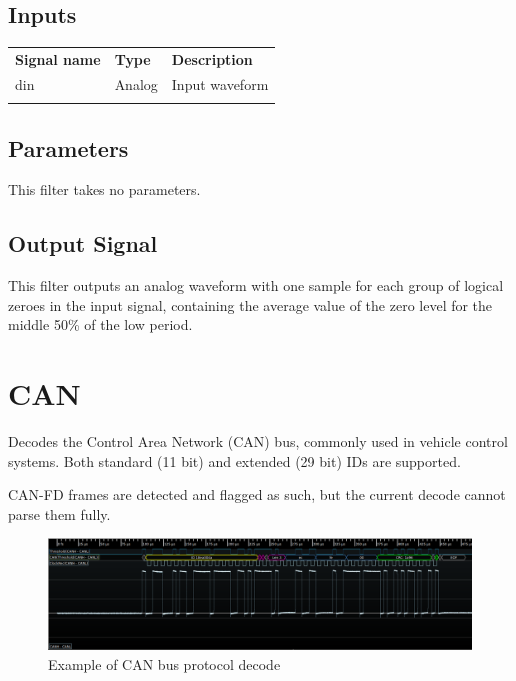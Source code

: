 \subsection{Inputs}

\begin{tabularx}{16cm}{llX}
\thickhline
\textbf{Signal name} & \textbf{Type} & \textbf{Description} \\
\thickhline
din & Analog & Input waveform \\
\thickhline
\end{tabularx}

\subsection{Parameters}

This filter takes no parameters.

\subsection{Output Signal}

This filter outputs an analog waveform with one sample for each group of logical zeroes in the input signal, containing
the average value of the zero level for the middle 50\% of the low period.

\pagebreak
\section{CAN}
\label{filter:can}

Decodes the Control Area Network (CAN) bus, commonly used in vehicle control systems. Both standard (11 bit) and
extended (29 bit) IDs are supported.

CAN-FD frames are detected and flagged as such, but the current decode cannot parse them fully.

\begin{figure}[h]
\centering
\includegraphics[width=16cm]{images/filters/can.png}
\caption{Example of CAN bus protocol decode}
\label{filter_can}
\end{figure}

